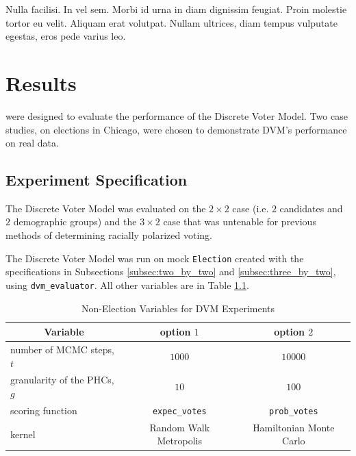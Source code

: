 \begin{savequote}[75mm]
Nulla facilisi. In vel sem. Morbi id urna in diam dignissim feugiat. Proin molestie tortor eu velit. Aliquam erat volutpat. Nullam ultrices, diam tempus vulputate egestas, eros pede varius leo.
\end{savequote}

\chapter{Results}
\label{chap:results}

 were designed to evaluate the performance of the Discrete Voter Model. Two case studies, on elections in Chicago, were chosen to demonstrate DVM's performance on real data.

\section{Experiment Specification}
\label{sec:exper_spec}

The Discrete Voter Model was evaluated on the $2 \times 2$ case (i.e. $2$ candidates and $2$ demographic groups) and the $3 \times 2$ case that was untenable for previous methods of determining racially polarized voting.

The Discrete Voter Model was run on mock \texttt{Election} created with the specifications in Subsections \ref{subsec:two_by_two} and \ref{subsec:three_by_two}, using \texttt{dvm\_evaluator}. All other variables are in Table \ref{table:dvm_vars}.

\begin{table}[ht]
 \centering
 \caption{Non-Election Variables for DVM Experiments}
 \label{table:dvm_vars}
 \begin{tabular}{|l|c|c|}
   \hline
   \multicolumn{1}{|c}{Variable} & \multicolumn{1}{|c|}{option $1$}& \multicolumn{1}{c|}{option $2$} \\
   \hline
   number of MCMC steps, $t$ & $1000$ & $10000$ \\
   granularity of the PHCs, $g$ & $10$ & $100$ \\
   scoring function & \texttt{expec\_votes} & \texttt{prob\_votes} \\
   kernel & Random Walk Metropolis & Hamiltonian Monte Carlo \\
  \hline
 \end{tabular}
\end{table}

